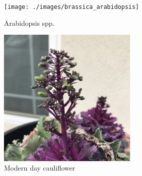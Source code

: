\documentclass[11pt,ignorenonframetext,aspectratio=169]{beamer}
\begin{document}
\begin{frame}{}
\protect\hypertarget{section-8}{}
\begin{figure}
\texttt{[image: ./images/brassica\_arabidopsis]} \caption{Arabidopsis spp.}\label{fig:wild-brassica}
\end{figure}

\begin{figure}
\includegraphics[width=0.6\textwidth, keepaspectratio,height=0.45\textheight]{./images/Ornamental_cabbage} \caption{Modern day cauliflower}\label{fig:modern-brassica}
\end{figure}
\end{frame}
\end{document}

